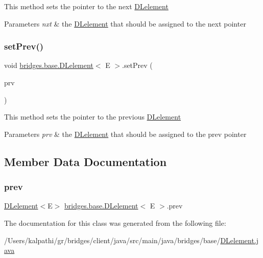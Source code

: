 This method sets the pointer to the next \mbox{\hyperlink{classbridges_1_1base_1_1_d_lelement}{D\+Lelement}}


\begin{DoxyParams}{Parameters}
{\em nxt} & the \mbox{\hyperlink{classbridges_1_1base_1_1_d_lelement}{D\+Lelement}} that should be assigned to the next pointer \\
\hline
\end{DoxyParams}
\mbox{\label{classbridges_1_1base_1_1_d_lelement_a152a06add922290d48b2d4affc87d592}} 
\subsubsection{\texorpdfstring{set\+Prev()}{setPrev()}}
{\footnotesize\ttfamily void \mbox{\hyperlink{classbridges_1_1base_1_1_d_lelement}{bridges.\+base.\+D\+Lelement}}$<$ E $>$.set\+Prev (\begin{DoxyParamCaption}\item[{\mbox{\hyperlink{classbridges_1_1base_1_1_d_lelement}{D\+Lelement}}$<$ E $>$}]{prv }\end{DoxyParamCaption})}

This method sets the pointer to the previous \mbox{\hyperlink{classbridges_1_1base_1_1_d_lelement}{D\+Lelement}}


\begin{DoxyParams}{Parameters}
{\em prv} & the \mbox{\hyperlink{classbridges_1_1base_1_1_d_lelement}{D\+Lelement}} that should be assigned to the prev pointer \\
\hline
\end{DoxyParams}


\subsection{Member Data Documentation}
\mbox{\label{classbridges_1_1base_1_1_d_lelement_a6eba4876f820b75ac6bde01d7dea9da7}} 
\subsubsection{\texorpdfstring{prev}{prev}}
{\footnotesize\ttfamily \mbox{\hyperlink{classbridges_1_1base_1_1_d_lelement}{D\+Lelement}}$<$E$>$ \mbox{\hyperlink{classbridges_1_1base_1_1_d_lelement}{bridges.\+base.\+D\+Lelement}}$<$ E $>$.prev\hspace{0.3cm}{\ttfamily [protected]}}



The documentation for this class was generated from the following file\+:\begin{DoxyCompactItemize}
\item 
/\+Users/kalpathi/gr/bridges/client/java/src/main/java/bridges/base/\mbox{\hyperlink{_d_lelement_8java}{D\+Lelement.\+java}}\end{DoxyCompactItemize}

